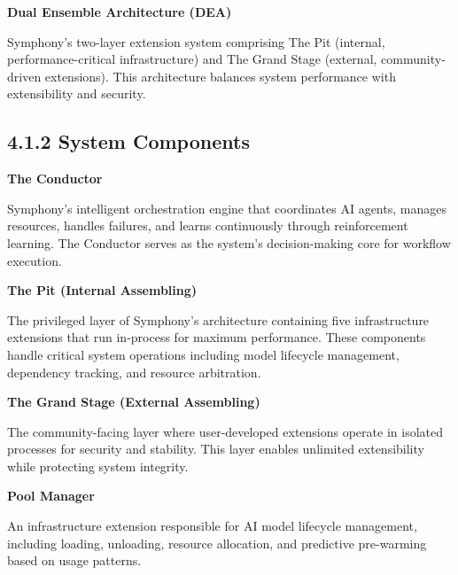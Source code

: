 \vspace{0.3cm}

\noindent\textbf{Dual Ensemble Architecture (DEA)}

Symphony's two-layer extension system comprising The Pit (internal, performance-critical infrastructure) and The Grand Stage (external, community-driven extensions). This architecture balances system performance with extensibility and security.

\subsection*{4.1.2 System Components}

\vspace{0.3cm}

\noindent\textbf{The Conductor}

Symphony's intelligent orchestration engine that coordinates AI agents, manages resources, handles failures, and learns continuously through reinforcement learning. The Conductor serves as the system's decision-making core for workflow execution.

\vspace{0.3cm}

\noindent\textbf{The Pit (Internal Assembling)}

The privileged layer of Symphony's architecture containing five infrastructure extensions that run in-process for maximum performance. These components handle critical system operations including model lifecycle management, dependency tracking, and resource arbitration.

\vspace{0.3cm}

\noindent\textbf{The Grand Stage (External Assembling)}

The community-facing layer where user-developed extensions operate in isolated processes for security and stability. This layer enables unlimited extensibility while protecting system integrity.

\vspace{0.3cm}

\noindent\textbf{Pool Manager}

An infrastructure extension responsible for AI model lifecycle management, including loading, unloading, resource allocation, and predictive pre-warming based on usage patterns.

\vspace{0.3cm}

